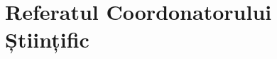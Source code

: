 \chapter*{Referatul Coordonatorului Științific}

\thispagestyle{front}
\pagestyle{front}

\newpage \
